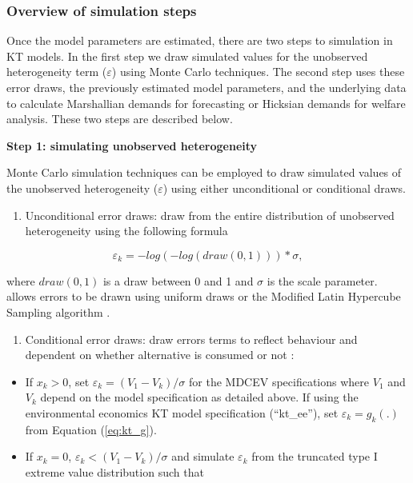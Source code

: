 \hypertarget{overview-of-simulation-steps}{%
\subsubsection{Overview of simulation
steps}\label{overview-of-simulation-steps}}

Once the model parameters are estimated, there are two steps to
simulation in KT models. In the first step we draw simulated values for
the unobserved heterogeneity term (\(\varepsilon\)) using Monte Carlo
techniques. The second step uses these error draws, the previously
estimated model parameters, and the underlying data to calculate
Marshallian demands for forecasting or Hicksian demands for welfare
analysis. These two steps are described below.

\textbf{Step 1: simulating unobserved heterogeneity}

Monte Carlo simulation techniques can be employed to draw simulated
values of the unobserved heterogeneity (\(\varepsilon\)) using either
unconditional or conditional draws.

\begin{enumerate}
\def\labelenumi{\arabic{enumi}.}
\tightlist
\item
  Unconditional error draws: draw from the entire distribution of
  unobserved heterogeneity using the following formula
\end{enumerate}

\begin{equation}
\varepsilon_{k} = -log(-log(draw(0,1))) * \sigma,
\end{equation}

where \(draw(0,1)\) is a draw between 0 and 1 and \(\sigma\) is the
scale parameter.  allows errors to be drawn using uniform
draws or the Modified Latin Hypercube Sampling algorithm
\citep{hesson2006}.

\begin{enumerate}
\def\labelenumi{\arabic{enumi}.}
\setcounter{enumi}{1}
\tightlist
\item
  Conditional error draws: draw errors terms to reflect behaviour and
  dependent on whether alternative is consumed or not
  \citep{vonhaefenincorporating2003, vonhaefenestimation2004}:
\end{enumerate}

\begin{itemize}
\tightlist
\item
  If \(x_k>0\), set \(\varepsilon_k = (V_1 - V_k)/ \sigma\) for the
  MDCEV specifications where \(V_1\) and \(V_k\) depend on the model
  specification as detailed above. If using the environmental economics
  KT model specification (``kt\_ee''), set \(\varepsilon_k = g_k(.)\)
  from Equation (\ref{eq:kt_g}).
\item
  If \(x_k=0\), \(\varepsilon_k < (V_1 - V_k)/ \sigma\) and simulate
  \(\varepsilon_k\) from the truncated type I extreme value distribution
  such that
\end{itemize}

